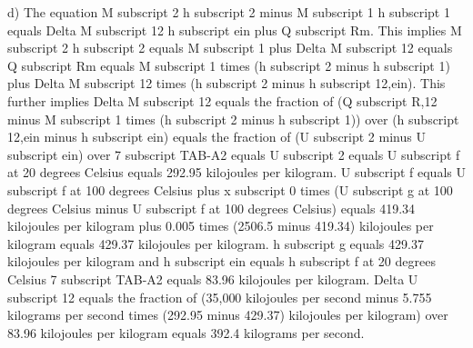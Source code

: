 d) The equation M subscript 2 h subscript 2 minus M subscript 1 h subscript 1 equals Delta M subscript 12 h subscript ein plus Q subscript Rm. This implies M subscript 2 h subscript 2 equals M subscript 1 plus Delta M subscript 12 equals Q subscript Rm equals M subscript 1 times (h subscript 2 minus h subscript 1) plus Delta M subscript 12 times (h subscript 2 minus h subscript 12,ein). This further implies Delta M subscript 12 equals the fraction of (Q subscript R,12 minus M subscript 1 times (h subscript 2 minus h subscript 1)) over (h subscript 12,ein minus h subscript ein) equals the fraction of (U subscript 2 minus U subscript ein) over 7 subscript TAB-A2 equals U subscript 2 equals U subscript f at 20 degrees Celsius equals 292.95 kilojoules per kilogram. U subscript f equals U subscript f at 100 degrees Celsius plus x subscript 0 times (U subscript g at 100 degrees Celsius minus U subscript f at 100 degrees Celsius) equals 419.34 kilojoules per kilogram plus 0.005 times (2506.5 minus 419.34) kilojoules per kilogram equals 429.37 kilojoules per kilogram. h subscript g equals 429.37 kilojoules per kilogram and h subscript ein equals h subscript f at 20 degrees Celsius 7 subscript TAB-A2 equals 83.96 kilojoules per kilogram. Delta U subscript 12 equals the fraction of (35,000 kilojoules per second minus 5.755 kilograms per second times (292.95 minus 429.37) kilojoules per kilogram) over 83.96 kilojoules per kilogram equals 392.4 kilograms per second.